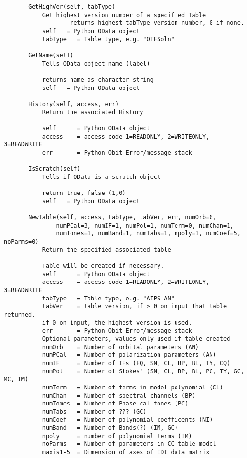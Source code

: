 \documentclass[11pt]{report}
\begin{document}
\begin{verbatim}
       GetHighVer(self, tabType)
           Get highest version number of a specified Table
                   returns highest tabType version number, 0 if none.
           self   = Python OData object
           tabType   = Table type, e.g. "OTFSoln"
       
       GetName(self)
           Tells OData object name (label)
           
           returns name as character string
           self   = Python OData object
       
       History(self, access, err)
           Return the associated History
           
           self      = Python OData object
           access    = access code 1=READONLY, 2=WRITEONLY, 3=READWRITE
           err       = Python Obit Error/message stack
       
       IsScratch(self)
           Tells if OData is a scratch object
           
           return true, false (1,0)
           self   = Python OData object
       
       NewTable(self, access, tabType, tabVer, err, numOrb=0,
               numPCal=3, numIF=1, numPol=1, numTerm=0, numChan=1, 
               numTones=1, numBand=1, numTabs=1, npoly=1, numCoef=5, noParms=0)
           Return the specified associated table
           
           Table will be created if necessary.
           self      = Python OData object
           access    = access code 1=READONLY, 2=WRITEONLY, 3=READWRITE
           tabType   = Table type, e.g. "AIPS AN"
           tabVer    = table version, if > 0 on input that table returned,
           if 0 on input, the highest version is used.
           err       = Python Obit Error/message stack
           Optional parameters, values only used if table created
           numOrb    = Number of orbital parameters (AN)
           numPCal   = Number of polarization parameters (AN)
           numIF     = Number of IFs (FQ, SN, CL, BP, BL, TY, CQ)
           numPol    = Number of Stokes' (SN, CL, BP, BL, PC, TY, GC, MC, IM)
           numTerm   = Number of terms in model polynomial (CL)
           numChan   = Number of spectral channels (BP)
           numTomes  = Number of Phase cal tones (PC)
           numTabs   = Number of ??? (GC)
           numCoef   = Number of polynomial coefficents (NI)
           numBand   = Number of Bands(?) (IM, GC)
           npoly     = number of polynomial terms (IM)
           noParms   = Number of parameters in CC table model
           maxis1-5  = Dimension of axes of IDI data matrix
       

\end{verbatim}
\end{document}
